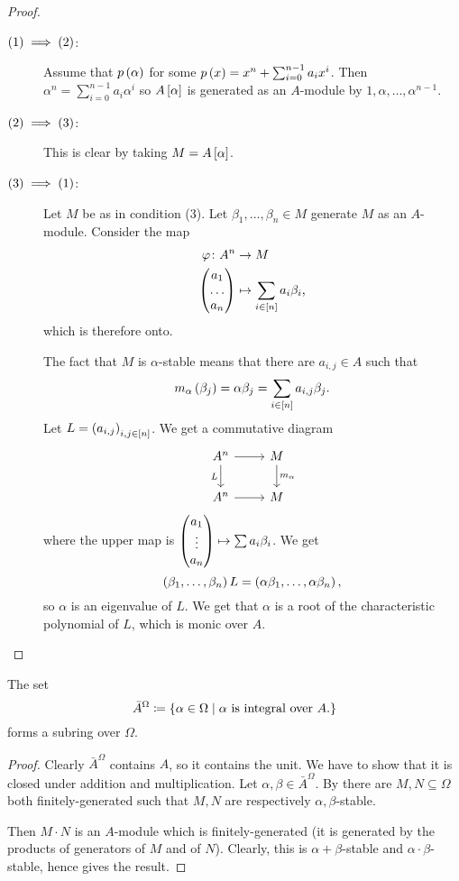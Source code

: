 \documentclass[11pt]{article}
\begin{document}
\begin{proof}
\begin{description}
\item[$\left( 1 \right) \implies \left( 2 \right)$:]
Assume that $p\left( \alpha \right)$ for some $p\left( x \right) = x^n + \sum_{i = 0}^{n-1} a_i x^i$.
Then $\alpha^n = \sum_{i=0}^{n-1} a_i \alpha^i$ so
$A\left[ \alpha \right]$ is generated as an $A$-module by $1, \alpha, \ldots, \alpha^{n-1}$.

\item[$\left( 2 \right) \implies \left( 3 \right)$:]
This is clear by taking $M = A\left[ \alpha \right]$.

\item[$\left( 3 \right) \implies \left( 1 \right)$:]
Let $M$ be as in condition (3). Let $\beta_1, \ldots, \beta_n \in M$ generate $M$ as an $A$-module.
Consider the map
\begin{align*}
\varphi \colon A^n &\to M \\
\begin{pmatrix}a_1 \\ \ldots \\ a_n\end{pmatrix} &\mapsto \sum_{i \in [n]} a_i \beta_i \text{,}
\end{align*}
which is therefore onto.

The fact that $M$ is $\alpha$-stable means that there are $a_{i,j} \in A$ such that
\[m_{\alpha}\left( \beta_j \right) = \alpha \beta_j = \sum_{i \in [n]} a_{i,j} \beta_j \text{.}\]
Let $L = \left( a_{i,j} \right)_{i,j \in [n]}$.
We get a commutative diagram
\[
\begin{tikzcd}
A^n \arrow[d, swap, "L"] \arrow[r] & M \arrow[d, "m_\alpha"] \\ A^n \arrow[r] & M
\end{tikzcd}
\]
where the upper map is $\begin{pmatrix}a_1 \\ \vdots \\ a_n\end{pmatrix} \mapsto \sum a_i \beta_i$.
We get
\[\left( \beta_1, \ldots, \beta_n \right) L = \left( \alpha \beta_1, \ldots, \alpha \beta_n \right) \text{,}\]
so $\alpha$ is an eigenvalue of $L$. We get that $\alpha$ is a root of the characteristic polynomial of $L$, which is monic over $A$.
\end{description}
\end{proof}

\begin{theorem}
The set
\[\bar{A}^{\Omega} \coloneqq \set{\alpha \in \Omega}{\text{$\alpha$ is integral over $A$.}}\]
forms a subring over $\Omega$.
\end{theorem}

\begin{proof}
Clearly $\bar{A}^\Omega$ contains $A$, so it contains the unit. We have to show that it is closed under addition and multiplication. Let $\alpha, \beta \in \bar{A}^{\Omega}$. By  there are $M,N \subseteq \Omega$ both finitely-generated such that $M,N$ are respectively $\alpha,\beta$-stable.

Then $M \cdot N$ is an $A$-module which is finitely-generated (it is generated by the products of generators of $M$ and of $N$). Clearly, this is $\alpha+\beta$-stable and $\alpha\cdot \beta$-stable, hence  gives the result.
\end{proof}
\end{document}
